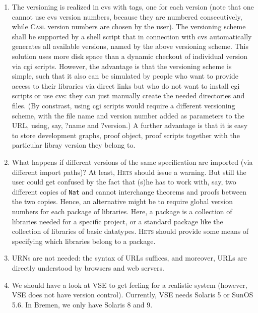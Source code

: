 \documentclass{article}
\newcommand{\CASL}{\textmd{\textsc{Casl}}\xspace }
\newcommand{\Hets}{\textmd{\textsc{Hets}}\xspace }
\begin{document}
\begin{enumerate}
\item The versioning is realized in cvs with tags, one for each version
(note that one cannot use cvs version numbers, because they are numbered
consecutively, while \CASL version numbers are chosen by the user).
The versioning scheme shall be supported by a shell script that in
connection with cvs automatically generates all available
versions, named by the above versioning scheme.
This solution uses more disk space than a dynamic checkout
of individual version via cgi scripts. However, the advantage
is that the versioning scheme is simple, such that it also
can be simulated by people who want to provide access to their
libraries via direct links but who do not want to install cgi
scripts or use cvs: they can just manually create the needed directories
and files. (By constrast, using cgi scripts would require
a different versioning scheme, with the file name and version
number added as parameters to the URL, using, say, ?name and ?version.)
A further advantage is that it is easy to store 
development graphs, proof object, proof scripts
together with the particular libray version they belong to.

\item What happens if different versions of the same specification
are imported (via different import paths)? At least, \Hets
should issue a warning. But still the user could get confused
by the fact that (s)he has to work with, say, two different
copies of \texttt{Nat} and cannot interchange theorems and proofs
between the two copies. Hence, an alternative might be to
require global version numbers for each package of libraries.
Here, a package is a collection of libraries needed for a specific
project, or a standard package like the collection of libraries
of basic datatypes.  \Hets should provide some means of
specifying which libraries belong to a package.

\item URNs are not needed: the syntax of URLs suffices, and moreover,
URLs are directly understood by browsers and web servers.

\item We should have a look at VSE to get feeling for a realistic system
(however, VSE does not have version control).
Currently, VSE needs Solaris 5 or SunOS 5.6. In Bremen, we only have Solaris 8 and 9.


\end{enumerate}
\end{document}
